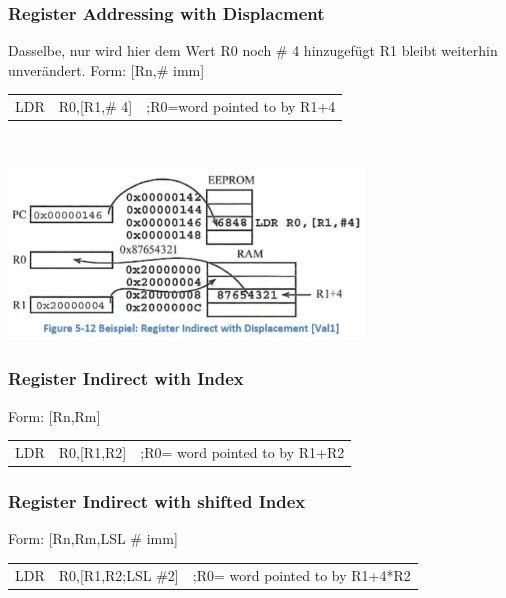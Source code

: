 \begin{multicols}{2}
    \begin{minipage}{\linewidth}
        \subsubsection{Register Addressing with Displacment}
        Dasselbe, nur wird hier dem Wert R0 noch \# 4 hinzugefügt\newline
        R1 bleibt weiterhin unverändert.\newline
        Form: [Rn,\# imm]\newline
        \begin{tabular}{lll}
            LDR & R0,[R1,\# 4]&;R0=word pointed to by R1+4 \\ 
        \end{tabular} \\
    \end{minipage}
    \includegraphics[width=0.9\linewidth]{images/AddressingDisplacment}    
\end{multicols} 

\subsubsection{Register Indirect with Index}
Form: [Rn,Rm]\newline
\begin{tabular}{lll}
   LDR &R0,[R1,R2]  &;R0= word pointed to by R1+R2 \\ 
\end{tabular} 

\subsubsection{Register Indirect with shifted Index}
Form: [Rn,Rm,LSL \# imm]\newline
\begin{tabular}{lll}
    LDR&R0,[R1,R2;LSL \#2]  &;R0= word pointed to by R1+4*R2  \\ 
\end{tabular} 

